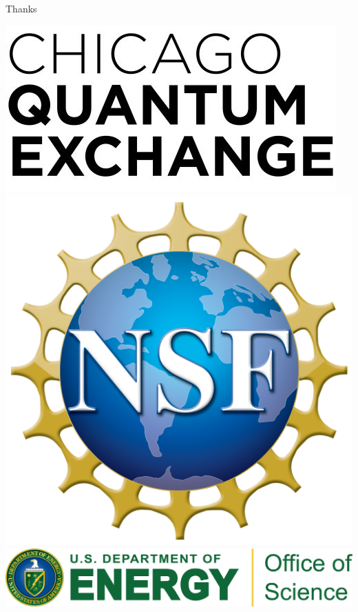 \documentclass[9pt, handout, aspectratio=169]{beamer}	%
\begin{document}
\begin{frame}{Thanks}

	\begin{center}
		\includegraphics[height=.15\paperwidth]{LOGOS/Sponsors/CQE}
		\includegraphics[height=.15\paperwidth]{LOGOS/Sponsors/NSF} \\
		\vspace{2em}
		\includegraphics[width=.70\paperwidth]{LOGOS/Sponsors/DOE}
	\end{center}

\end{frame}
\end{document}
